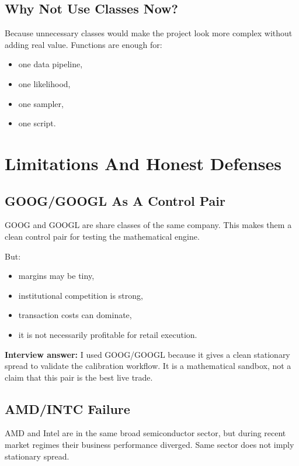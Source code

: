 \documentclass[11pt]{article}
\begin{document}
\subsection{Why Not Use Classes Now?}

Because unnecessary classes would make the project look more complex without
adding real value. Functions are enough for:

\begin{itemize}
  \item one data pipeline,
  \item one likelihood,
  \item one sampler,
  \item one script.
\end{itemize}

\section{Limitations And Honest Defenses}

\subsection{GOOG/GOOGL As A Control Pair}

GOOG and GOOGL are share classes of the same company. This makes them a clean
control pair for testing the mathematical engine.

But:

\begin{itemize}
  \item margins may be tiny,
  \item institutional competition is strong,
  \item transaction costs can dominate,
  \item it is not necessarily profitable for retail execution.
\end{itemize}

\textbf{Interview answer:} I used GOOG/GOOGL because it gives a clean
stationary spread to validate the calibration workflow. It is a mathematical
sandbox, not a claim that this pair is the best live trade.

\subsection{AMD/INTC Failure}

AMD and Intel are in the same broad semiconductor sector, but during recent
market regimes their business performance diverged. Same sector does not imply
stationary spread.
\end{document}
